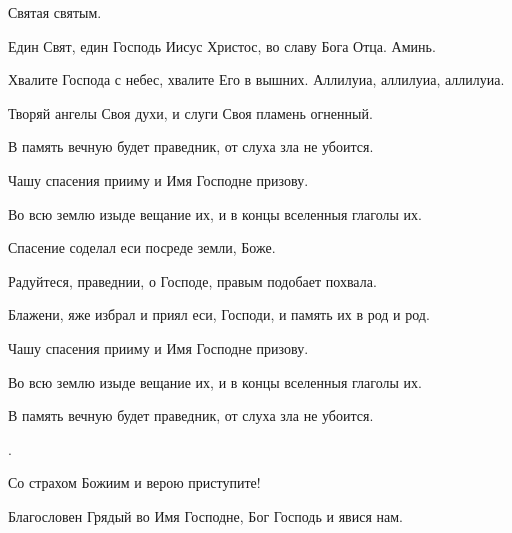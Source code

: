 \begin{mymulticols}

 Святая святым. 

 Един Свят, един Господь Иисус Христос, во славу Бога Отца. Аминь. 






 Хвалите Господа с небес, хвалите Его в вышних. Аллилуиа, аллилуиа, аллилуиа. 

 Творяй ангелы Своя духи, и слуги Своя пламень огненный. 

 В память вечную будет праведник, от слуха зла не убоится. 

 Чашу спасения прииму и Имя Господне призову. 

 Во всю землю изыде вещание их, и в концы вселенныя глаголы их. 

 Спасение соделал еси посреде земли, Боже. 

 Радуйтеся, праведнии, о Господе, правым подобает похвала. 

 Блажени, яже избрал и приял еси, Господи, и память их в род и род. 

 Чашу спасения прииму и Имя Господне призову. 

 Во всю землю изыде вещание их, и в концы вселенныя глаголы их. 

 В память вечную будет праведник, от слуха зла не убоится. 

.

 Со страхом Божиим и верою приступите! 


 Благословен Грядый во Имя Господне, Бог Господь и явися нам.


\end{mymulticols}
